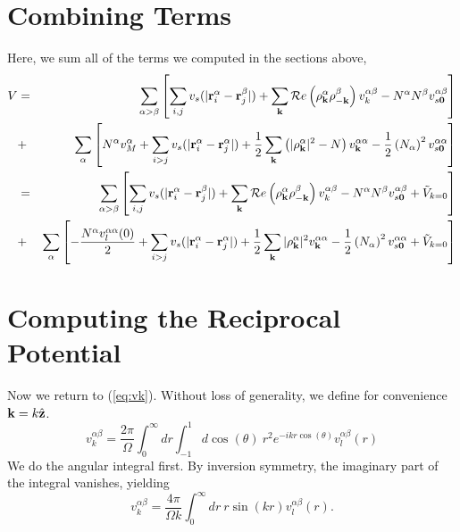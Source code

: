 \documentclass{article}
\begin{document}
\section{Combining Terms}
Here, we sum all of the terms we computed in the sections above,
\begin{eqnarray}
V & = & \sum_{\alpha > \beta} \left[\sum_{i,j} v_s(|\mathbf{r}_i^\alpha
  -\mathbf{r}_j^\beta|) + \sum_{\mathbf{k}} \mathcal{R}e\left(\rho_{\mathbf{k}}^\alpha
  \rho_{-\mathbf{k}}^\beta\right)v^{\alpha\beta}_k  -N^\alpha N^\beta
  v^{\alpha \beta}_{s\mathbf{0}}  \right] \nonumber \\
& + & \sum_\alpha \left[ N^\alpha v_M^\alpha + \sum_{i>j} v_s(|\mathbf{r}_i^\alpha -
  \mathbf{r}_j^\alpha|) + \frac{1}{2} \sum_{\mathbf{k}} \left( |\rho_{\mathbf{k}}^\alpha|^2 -
  N\right) v^{\alpha\alpha}_{\mathbf{k}} -\frac{1}{2}\left(N_\alpha\right)^2 v_{s\mathbf{0}}^{\alpha\alpha}\right] \nonumber \\
& = & \sum_{\alpha > \beta} \left[\sum_{i,j} v_s(|\mathbf{r}_i^\alpha
  -\mathbf{r}_j^\beta|) + \sum_{\mathbf{k}} \mathcal{R}e\left(\rho_{\mathbf{k}}^\alpha
  \rho_{-\mathbf{k}}^\beta\right) v^{\alpha \beta}_k   -N^\alpha N^\beta
  v^{\alpha \beta}_{s\mathbf{0}}  +\tilde{V}_{k=0} \right] \\
& + & \sum_\alpha \left[ -\frac{N^\alpha v_l^{\alpha \alpha}(0)}{2}  + \sum_{i>j} v_s(|\mathbf{r}_i^\alpha -
  \mathbf{r}_j^\alpha|) + \frac{1}{2} \sum_{\mathbf{k}} |\rho_{\mathbf{k}}^\alpha|^2 v^{\alpha\alpha}_{\mathbf{k}} - \frac{1}{2}\left(N_\alpha\right)^2
  v_{s\mathbf{0}}^{\alpha\alpha} +\tilde{V}_{k=0}\right]  \nonumber
\end{eqnarray}

\section {Computing the Reciprocal Potential}
Now we return to (\ref{eq:vk}).  Without loss of generality, we define
for convenience $\mathbf{k} = k\hat{\mathbf{z}}$.
\begin{equation}
v^{\alpha \beta}_k = \frac{2\pi}{\Omega} \int_0^\infty dr \int_{-1}^1
  d\cos(\theta) \ r^2 e^{-i k r \cos(\theta)} v_l^{\alpha \beta}(r)
\end{equation}
We do the angular integral first.  By inversion symmetry, the
imaginary part of the integral vanishes, yielding
\begin{equation}
v^{\alpha \beta}_k = \frac{4\pi}{\Omega k}\int _0^\infty dr\ r \sin(kr)
v^{\alpha \beta}_l(r).
\label{eq:vkint}
\end{equation}
\end{document}
